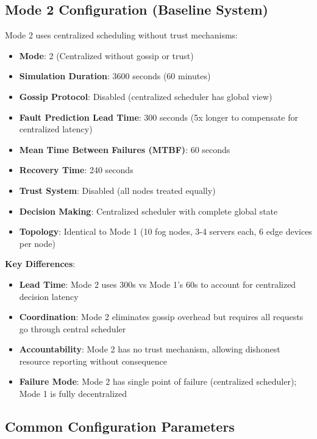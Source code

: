 \documentclass[12pt,a4paper]{article}
\begin{document}
\subsection{Mode 2 Configuration (Baseline System)}

Mode 2 uses centralized scheduling without trust mechanisms:

\begin{itemize}
    \item \textbf{Mode}: 2 (Centralized without gossip or trust)
    \item \textbf{Simulation Duration}: 3600 seconds (60 minutes)
    \item \textbf{Gossip Protocol}: Disabled (centralized scheduler has global view)
    \item \textbf{Fault Prediction Lead Time}: 300 seconds (5x longer to compensate for centralized latency)
    \item \textbf{Mean Time Between Failures (MTBF)}: 60 seconds
    \item \textbf{Recovery Time}: 240 seconds
    \item \textbf{Trust System}: Disabled (all nodes treated equally)
    \item \textbf{Decision Making}: Centralized scheduler with complete global state
    \item \textbf{Topology}: Identical to Mode 1 (10 fog nodes, 3-4 servers each, 6 edge devices per node)
\end{itemize}

\textbf{Key Differences}:
\begin{itemize}
    \item \textbf{Lead Time}: Mode 2 uses 300s vs Mode 1's 60s to account for centralized decision latency
    \item \textbf{Coordination}: Mode 2 eliminates gossip overhead but requires all requests go through central scheduler
    \item \textbf{Accountability}: Mode 2 has no trust mechanism, allowing dishonest resource reporting without consequence
    \item \textbf{Failure Mode}: Mode 2 has single point of failure (centralized scheduler); Mode 1 is fully decentralized
\end{itemize}

\subsection{Common Configuration Parameters}
\end{document}
